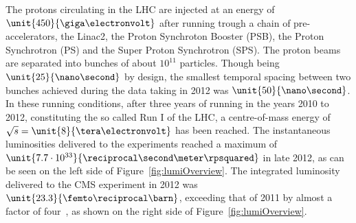 The protons circulating in the LHC are injected at an energy of $\unit{450}{\giga\electronvolt}$ after running trough a chain of pre-accelerators, the Linac2, the Proton Synchroton Booster (PSB), the Proton Synchrotron (PS) and the Super Proton Synchrotron (SPS). The proton beams are separated into bunches of about $10^{11}$ particles. Though being $\unit{25}{\nano\second}$ by design, the smallest temporal spacing between two bunches achieved during the data taking in 2012 was $\unit{50}{\nano\second}$. In these running conditions, after three years of running in the years 2010 to 2012, constituting the so called Run I of the LHC, a centre-of-mass energy of $\sqrt{s} = \unit{8}{\tera\electronvolt}$ has been reached. The instantaneous luminosities delivered to the experiments reached a maximum of $\unit{7.7\cdot 10^{33}}{\reciprocal\second\meter\rpsquared}$ in late 2012, as can be seen on the left side of Figure~\ref{fig:lumiOverview}. The integrated luminosity delivered to the CMS experiment in 2012 was $\unit{23.3}{\femto\reciprocal\barn}$, exceeding that of 2011 by almost a factor of four~\cite{LumiTwiki}, as shown on the right side of Figure~\ref{fig:lumiOverview}. 

